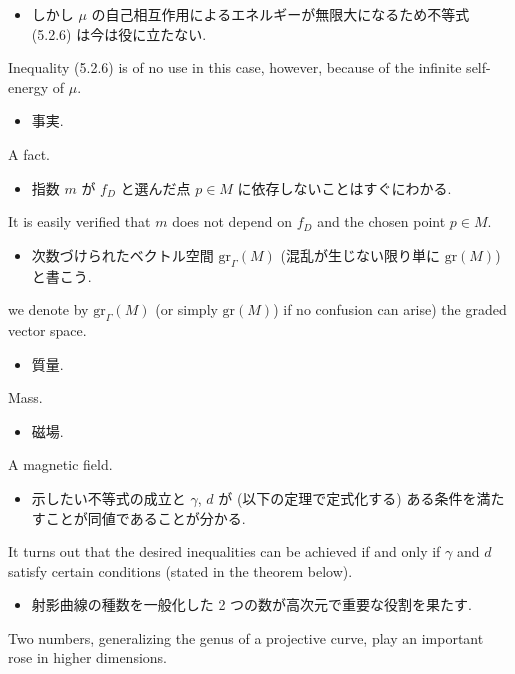 \documentclass[openany, a4paper, oneside]{jsbook}
\begin{document}
\begin{itemize}
\item しかし $\mu$ の自己相互作用によるエネルギーが無限大になるため不等式 (5.2.6) は今は役に立たない. \cite{LiebSeiringer1}
\end{itemize}
Inequality (5.2.6) is of no use in this case, however, because of the infinite self-energy of $\mu$.

\begin{itemize}
\item 事実.
\end{itemize}
A fact.

\begin{itemize}
\item 指数 $m$ が $f_D$ と選んだ点 $p \in M$ に依存しないことはすぐにわかる.
\end{itemize}
It is easily verified that $m$ does not depend on $f_D$ and the chosen point $p \in M$.

\begin{itemize}
\item 次数づけられたベクトル空間 $\mathrm{gr}_{\Gamma} (M)$ (混乱が生じない限り単に $\mathrm{gr} (M)$) と書こう.
\end{itemize}
we denote by $\mathrm{gr}_{\Gamma} (M)$ (or simply $\mathrm{gr} (M)$) if no confusion can arise) the graded vector space.

\begin{itemize}
\item 質量.
\end{itemize}
Mass.

\begin{itemize}
\item 磁場.
\end{itemize}
A magnetic field.

\begin{itemize}
\item 示したい不等式の成立と $\gamma$, $d$ が (以下の定理で定式化する) ある条件を満たすことが同値であることが分かる. \cite{LiebSeiringer1}
\end{itemize}
It turns out that the desired inequalities can be achieved if and only if
$\gamma$ and $d$ satisfy certain conditions (stated in the theorem below).

\begin{itemize}
\item 射影曲線の種数を一般化した 2 つの数が高次元で重要な役割を果たす. \cite{ChrisPeters1}
\end{itemize}
Two numbers, generalizing the genus of a projective curve, play
an important rose in higher dimensions.
\end{document}
